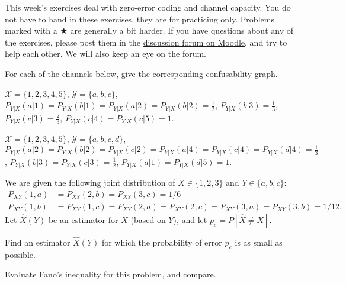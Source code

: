 \documentclass[a4paper,10pt,landscape,twocolumn]{scrartcl}
\begin{document}
\practiceproblems

{\sffamily\noindent
This week's exercises deal with zero-error coding and channel capacity. You do not have to hand in these exercises, they are for practicing only. Problems marked with a $\bigstar$ are generally a bit harder. If you have questions about any of the exercises, please post them in the \href{https://www.moodle.ch/lms/mod/forum/view.php?id=2219}{discussion forum on Moodle}, and try to help each other. We will also keep an eye on the forum.
}

\begin{exercise}
For each of the channels below, give the corresponding confusability graph.
	\begin{subex}
	$\mathcal{X} = \{1,2,3,4,5\}$, $\mathcal{Y} = \{a,b,c\}$, $P_{Y|X}(a|1) = P_{Y|X}(b|1) = P_{Y|X}(a|2) = P_{Y|X}(b|2) = \frac{1}{2}$, $P_{Y|X}(b|3) = \frac{1}{3}$, $P_{Y|X}(c|3) = \frac{2}{3}$, $P_{Y|X}(c|4) = P_{Y|X}(c|5) = 1$.
	\end{subex}
	\begin{subex}
	$\mathcal{X} = \{1,2,3,4,5\}$, $\mathcal{Y} = \{a,b,c,d\}$, $P_{Y|X}(a|2) = P_{Y|X}(b|2) = P_{Y|X}(c|2) = P_{Y|X}(a|4) = P_{Y|X}(c|4) = P_{Y|X}(d|4) = \frac{1}{3}$, $P_{Y|X}(b|3) = P_{Y|X}(c|3) = \frac{1}{2}$, $P_{Y|X}(a|1) = P_{Y|X}(d|5) = 1$.
	\end{subex}
\end{exercise}

\begin{exercise}[]
We are given the following joint distribution of $X \in \{1,2,3\}$ and $Y \in \{a,b,c\}$:
\begin{align*}
P_{XY}(1,a) &= P_{XY}(2,b) = P_{XY}(3,c) = 1/6\\
P_{XY}(1,b) &= P_{XY}(1,c) = P_{XY}(2,a) = P_{XY}(2,c) = P_{XY}(3,a) = P_{XY}(3,b) = 1/12.
\end{align*}
Let $\hat{X}(Y)$ be an estimator for $X$ (based on $Y$), and let $p_{e} = P[\hat{X} \neq X]$.
	\begin{subex}
	Find an estimator $\hat{X}(Y)$ for which the probability of error $p_e$ is as small as possible.
	\end{subex}
	\begin{subex}
	Evaluate Fano's inequality for this problem, and compare.
	\end{subex}
\end{exercise}
\end{document}
